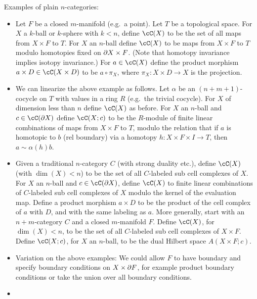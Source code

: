 Examples of plain $n$-categories:
\begin{itemize}

\item Let $F$ be a closed $m$-manifold (e.g.\ a point).
Let $T$ be a topological space.
For $X$ a $k$-ball or $k$-sphere with $k < n$, define $\cC(X)$ to be the set of 
all maps from $X\times F$ to $T$.
For $X$ an $n$-ball define $\cC(X)$ to be maps from $X\times F$ to $T$ modulo
homotopies fixed on $\partial X \times F$.
(Note that homotopy invariance implies isotopy invariance.)
For $a\in \cC(X)$ define the product morphism $a\times D \in \cC(X\times D)$ to
be $a\circ\pi_X$, where $\pi_X : X\times D \to X$ is the projection.

\item We can linearize the above example as follows.
Let $\alpha$ be an $(n{+}m{+}1)$-cocycle on $T$ with values in a ring $R$
(e.g.\ the trivial cocycle).
For $X$ of dimension less than $n$ define $\cC(X)$ as before.
For $X$ an $n$-ball and $c\in \cC(\bd X)$ define $\cC(X; c)$ to be
the $R$-module of finite linear combinations of maps from $X\times F$ to $T$,
modulo the relation that if $a$ is homotopic to $b$ (rel boundary) via a homotopy
$h: X\times F\times I \to T$, then $a \sim \alpha(h)b$.

\item Given a traditional $n$-category $C$ (with strong duality etc.),
define $\cC(X)$ (with $\dim(X) < n$) 
to be the set of all $C$-labeled sub cell complexes of $X$.
For $X$ an $n$-ball and $c\in \cC(\bd X)$, define $\cC(X)$ to finite linear
combinations of $C$-labeled sub cell complexes of $X$
modulo the kernel of the evaluation map.
Define a product morphism $a\times D$ to be the product of the cell complex of $a$ with $D$,
and with the same labeling as $a$.
More generally, start with an $n{+}m$-category $C$ and a closed $m$-manifold $F$.
Define $\cC(X)$, for $\dim(X) < n$,
to be the set of all $C$-labeled sub cell complexes of $X\times F$.
Define $\cC(X; c)$, for $X$ an $n$-ball,
to be the dual Hilbert space $A(X\times F; c)$.

\item Variation on the above examples:
We could allow $F$ to have boundary and specify boundary conditions on $X\times \partial F$,
for example product boundary conditions or take the union over all boundary conditions.

\item {}

\end{itemize}


